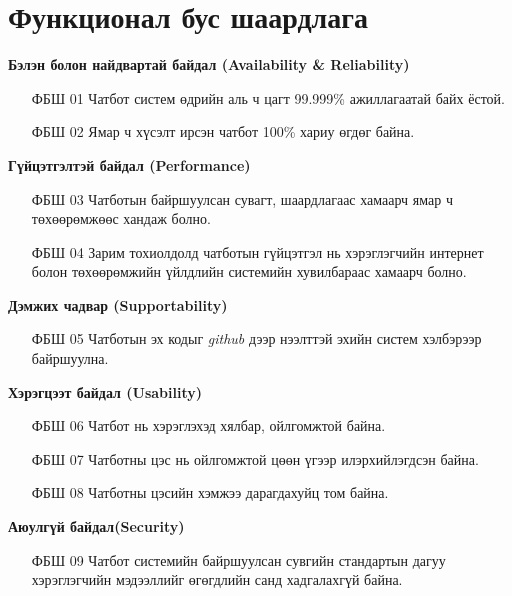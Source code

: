 \section{Функционал бус шаардлага}
\quad\textbf{Бэлэн болон найдвартай байдал (Availability \& Reliability)}
\begin{itemize}
  \item[ФБШ 01] Чатбот систем өдрийн аль ч цагт 99.999\% ажиллагаатай байх ёстой.
  \item[ФБШ 02] Ямар ч хүсэлт ирсэн чатбот 100\% хариу өгдөг байна. 
\end{itemize}
\quad\quad\textbf{Гүйцэтгэлтэй байдал (Performance)}
\begin{itemize}
  \item[ФБШ 03] Чатботын байршуулсан сувагт, шаардлагаас хамаарч ямар ч төхөөрөмжөөс хандаж болно.
  \item[ФБШ 04] Зарим тохиолдолд чатботын гүйцэтгэл нь хэрэглэгчийн интернет болон төхөөрөмжийн үйлдлийн системийн хувилбараас хамаарч болно.
\end{itemize}
\quad\quad\textbf{Дэмжих чадвар (Supportability)}
\begin{itemize}
  \item[ФБШ 05] Чатботын эх кодыг \textit{github} дээр нээлттэй эхийн систем хэлбэрээр байршуулна.
\end{itemize}
\quad\quad\textbf{Хэрэгцээт байдал (Usability)}
\begin{itemize}
  \item[ФБШ 06] Чатбот нь хэрэглэхэд хялбар, ойлгомжтой байна.
  \item[ФБШ 07] Чатботны цэс нь ойлгомжтой цөөн үгээр илэрхийлэгдсэн байна. 
  \item[ФБШ 08] Чатботны цэсийн хэмжээ дарагдахуйц том байна.
\end{itemize}
\quad\quad\textbf{Аюулгүй байдал(Security)}
\begin{itemize}
  \item[ФБШ 09] Чатбот системийн байршуулсан сувгийн стандартын дагуу хэрэглэгчийн мэдээллийг өгөгдлийн санд хадгалахгүй байна.  
\end{itemize}
\newpage
